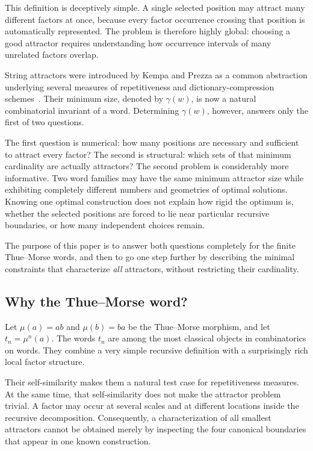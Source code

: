 \documentclass[10pt,a4paper]{article}
\theoremstyle{definition}\newtheorem{definition}[theorem]{Definition}
\theoremstyle{remark}\newtheorem{remark}[theorem]{Remark}
\begin{document}
This definition is deceptively simple. A single selected position may attract many different factors at once, because every factor occurrence crossing that position is automatically represented. The problem is therefore highly global: choosing a good attractor requires understanding how occurrence intervals of many unrelated factors overlap.

String attractors were introduced by Kempa and Prezza as a common abstraction underlying several measures of repetitiveness and dictionary-compression schemes~\cite{KempaPrezza2018}. Their minimum size, denoted by $\gamma(w)$, is now a natural combinatorial invariant of a word. Determining $\gamma(w)$, however, answers only the first of two questions.

The first question is numerical: how many positions are necessary and sufficient to attract every factor? The second is structural: which sets of that minimum cardinality are actually attractors? The second problem is considerably more informative. Two word families may have the same minimum attractor size while exhibiting completely different numbers and geometries of optimal solutions. Knowing one optimal construction does not explain how rigid the optimum is, whether the selected positions are forced to lie near particular recursive boundaries, or how many independent choices remain.

The purpose of this paper is to answer both questions completely for the finite Thue--Morse words, and then to go one step further by describing the minimal constraints that characterize \emph{all} attractors, without restricting their cardinality.

\subsection{Why the Thue--Morse word?}
Let
$
\mu(a)=ab
$ 
and 
$
\mu(b)=ba
$
be the Thue--Morse morphism, and let $t_n=\mu^n(a)$. The words $t_n$ are among the most classical objects in combinatorics on words. They combine a very simple recursive definition with a surprisingly rich local factor structure.

Their self-similarity makes them a natural test case for repetitiveness measures. At the same time, that self-similarity does not make the attractor problem trivial. A factor may occur at several scales and at different locations inside the recursive decomposition. Consequently, a characterization of all smallest attractors cannot be obtained merely by inspecting the four canonical boundaries that appear in one known construction.
\end{document}
